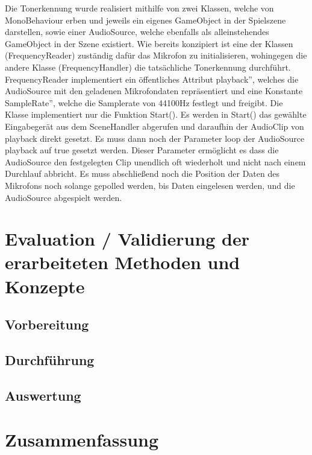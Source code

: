Die Tonerkennung wurde realisiert mithilfe von zwei Klassen, welche von MonoBehaviour erben und jeweils ein eigenes GameObject in der Spielszene darstellen, sowie einer AudioSource, welche ebenfalls als alleinstehendes GameObject in der Szene existiert. Wie bereits konzipiert ist eine der Klassen (FrequencyReader) zuständig dafür das Mikrofon zu initialisieren, wohingegen die andere Klasse (FrequencyHandler) die tatsächliche Tonerkennung durchführt. \\
FrequencyReader implementiert ein öffentliches Attribut \glqq playback'', welches die AudioSource mit den geladenen Mikrofondaten repräsentiert und eine Konstante \glqq SampleRate'', welche die Samplerate von 44100Hz festlegt und freigibt. Die Klasse implementiert nur die Funktion Start(). Es werden in Start() das gewählte Eingabegerät aus dem SceneHandler abgerufen und daraufhin der AudioClip von playback direkt gesetzt. Es muss dann noch der Parameter loop der AudioSource playback auf true gesetzt werden. Dieser Parameter ermöglicht es dass die AudioSource den festgelegten Clip unendlich oft wiederholt und nicht nach einem Durchlauf abbricht. Es muss abschließend noch die Position der Daten des Mikrofons noch solange gepolled werden, bis Daten eingelesen werden, und die AudioSource abgespielt werden. 

\chapter{Evaluation / Validierung der erarbeiteten Methoden und Konzepte}


\section{Vorbereitung}
\section{Durchführung}
\section{Auswertung}


\chapter{Zusammenfassung}


